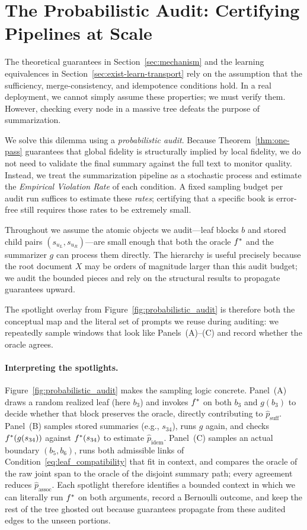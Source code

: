 \section{The Probabilistic Audit: Certifying Pipelines at Scale}
\label{sec:audit}

The theoretical guarantees in Section~\ref{sec:mechanism} and the learning equivalences in Section~\ref{sec:exist-learn-transport} rely on the assumption that the sufficiency, merge-consistency, and idempotence conditions hold. In a real deployment, we cannot simply assume these properties; we must verify them. However, checking every node in a massive tree defeats the purpose of summarization.

We solve this dilemma using a \emph{probabilistic audit}. Because Theorem~\ref{thm:one-pass} guarantees that global fidelity is structurally implied by local fidelity, we do not need to validate the final summary against the full text to monitor quality. Instead, we treat the summarization pipeline as a stochastic process and estimate the \emph{Empirical Violation Rate} of each condition. A fixed sampling budget per audit run suffices to estimate these \emph{rates}; certifying that a specific book is error-free still requires those rates to be extremely small.

Throughout we assume the atomic objects we audit---leaf blocks $b$ and stored child pairs $(s_{u_L},s_{u_R})$---are small enough that both the oracle $f^{\ast}$ and the summarizer $g$ can process them directly. The hierarchy is useful precisely because the root document $X$ may be orders of magnitude larger than this audit budget; we audit the bounded pieces and rely on the structural results to propagate guarantees upward.

The spotlight overlay from Figure~\ref{fig:probabilistic_audit} is therefore both the conceptual map and the literal set of prompts we reuse during auditing: we repeatedly sample windows that look like Panels~(A)--(C) and record whether the oracle agrees.


\paragraph{Interpreting the spotlights.}
Figure~\ref{fig:probabilistic_audit} makes the sampling logic concrete. Panel~(A) draws a random realized leaf (here $b_3$) and invokes $f^{\ast}$ on both $b_3$ and $g(b_3)$ to decide whether that block preserves the oracle, directly contributing to $\hat{p}_{\text{suff}}$. Panel~(B) samples stored summaries (e.g., $s_{34}$), runs $g$ again, and checks $f^{\ast}(g(s_{34}))$ against $f^{\ast}(s_{34})$ to estimate $\hat{p}_{\text{idem}}$. Panel~(C) samples an actual boundary $(b_5,b_6)$, runs both admissible links of Condition~\eqref{eq:leaf_compatibility} that fit in context, and compares the oracle of the raw joint span to the oracle of the disjoint summary path; every agreement reduces $\hat{p}_{\text{assoc}}$. Each spotlight therefore identifies a bounded context in which we can literally run $f^{\ast}$ on both arguments, record a Bernoulli outcome, and keep the rest of the tree ghosted out because guarantees propagate from these audited edges to the unseen portions.

